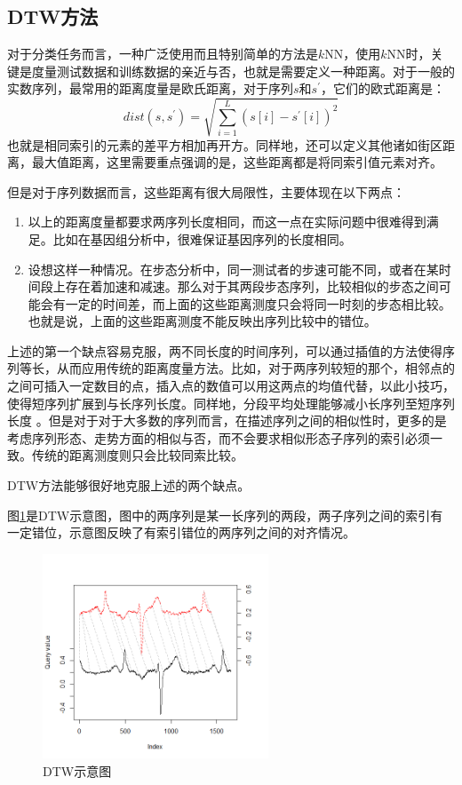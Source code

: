 \subsection{DTW方法}
对于分类任务而言，一种广泛使用而且特别简单的方法是$k$NN，使用$k$NN时，关键是度量测试数据和训练数据的亲近与否，也就是需要定义一种距离。对于一般的实数序列，最常用的距离度量是欧氏距离，对于序列$s$和$s^{'}$，它们的欧式距离是：
\begin{equation}\label{equ:1}
  dist\left( {s,{s^{'}}} \right) = \sqrt {\sum\limits_{i = 1}^L {{{\left( {s\left[ i \right] - {s^{'}}\left[ i \right]} \right)}^2}} }
\end{equation}
也就是相同索引的元素的差平方相加再开方。同样地，还可以定义其他诸如街区距离，最大值距离，这里需要重点强调的是，这些距离都是将同索引值元素对齐。

但是对于序列数据而言，这些距离有很大局限性，主要体现在以下两点：
\begin{enumerate}
  \item 以上的距离度量都要求两序列长度相同，而这一点在实际问题中很难得到满足。比如在基因组分析中，很难保证基因序列的长度相同。
  \item 设想这样一种情况。在步态分析中，同一测试者的步速可能不同，或者在某时间段上存在着加速和减速。那么对于其两段步态序列，比较相似的步态之间可能会有一定的时间差，而上面的这些距离测度只会将同一时刻的步态相比较。也就是说，上面的这些距离测度不能反映出序列比较中的错位。
\end{enumerate}

上述的第一个缺点容易克服，两不同长度的时间序列，可以通过插值的方法使得序列等长，从而应用传统的距离度量方法。比如，对于两序列较短的那个，相邻点的之间可插入一定数目的点，插入点的数值可以用这两点的均值代替，以此小技巧，使得短序列扩展到与长序列长度。同样地，分段平均处理能够减小长序列至短序列长度 \cite{Keogh2000}。但是对于对于大多数的序列而言，在描述序列之间的相似性时，更多的是考虑序列形态、走势方面的相似与否，而不会要求相似形态子序列的索引必须一致。传统的距离测度则只会比较同索比较。

DTW方法能够很好地克服上述的两个缺点。

图\ref{fig：1}是DTW示意图，图中的两序列是某一长序列的两段，两子序列之间的索引有一定错位，示意图反映了有索引错位的两序列之间的对齐情况\cite{Giorgino2009}。
\begin{figure}[h]
  \centering
  \includegraphics[width=0.6\textwidth]{./figure/two_way_plot.png}
  \caption{DTW示意图}\label{fig：1}
\end{figure}

